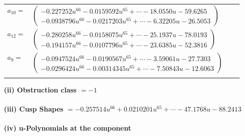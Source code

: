 \documentclass[1p]{elsarticle_modified}
\theoremstyle{definition}
\begin{document}
\begin{tabular}{m{7pt} m{180pt} m{7pt} m{180pt} }
\flushright $a_{10}=$&$\begin{pmatrix}-0.227252 u^{66}-0.0159592 u^{65}+\cdots-18.0550 u-59.6265\\-0.0938796 u^{66}-0.0217203 u^{65}+\cdots-6.32205 u-26.5053\end{pmatrix}$ \\
\flushright $a_{12}=$&$\begin{pmatrix}-0.280258 u^{66}-0.0158075 u^{65}+\cdots-25.1937 u-78.0193\\-0.194157 u^{66}-0.0107796 u^{65}+\cdots-23.6385 u-52.3816\end{pmatrix}$ \\
\flushright $a_{9}=$&$\begin{pmatrix}-0.0947524 u^{66}-0.0190567 u^{65}+\cdots-3.59061 u-27.7303\\-0.0296424 u^{66}-0.00314345 u^{65}+\cdots-7.50843 u-12.6063\end{pmatrix}$\\&\end{tabular}
\flushleft \textbf{(ii) Obstruction class $= -1$}\\~\\
\flushleft \textbf{(iii) Cusp Shapes $= -0.257514 u^{66}+0.0210201 u^{65}+\cdots-47.1768 u-88.2413$}\\~\\
\newpage\renewcommand{\arraystretch}{1}
\flushleft \textbf{(iv) u-Polynomials at the component}\newline \\
\end{document}
